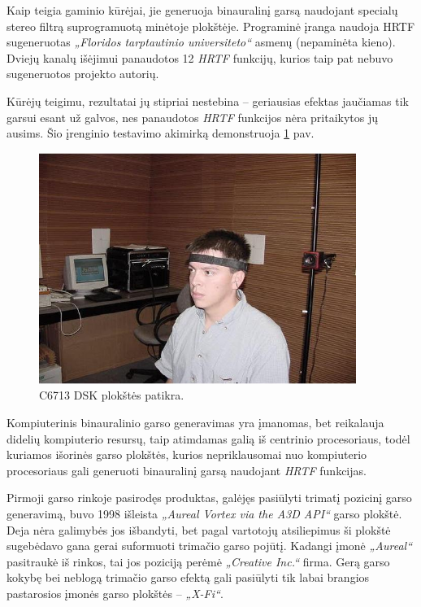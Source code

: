 \documentclass[]{vgtuef}
\begin{document}
Kaip teigia gaminio kūrėjai, jie generuoja binauralinį garsą naudojant specialų stereo filtrą suprogramuotą minėtoje plokštėje. Programinė įranga naudoja HRTF sugeneruotas \textit{„Floridos tarptautinio universiteto“} asmenų (nepaminėta kieno). Dviejų kanalų išėjimui panaudotos 12 \textit{HRTF} funkcijų, kurios taip pat nebuvo sugeneruotos projekto autorių. 

Kūrėjų teigimu, rezultatai jų stipriai nestebina – geriausias efektas jaučiamas tik garsui esant už galvos, nes panaudotos \textit{HRTF} funkcijos nėra pritaikytos jų ausims. Šio įrenginio testavimo akimirką demonstruoja \ref{fig:C6713_dsk_board_checkout} pav.

\begin{figure}[!ht]
  \centering
  \includegraphics[width=390px]{img/c6713_patikra.jpg}
  \caption{C6713 DSK plokštės patikra.}
  \label{fig:C6713_dsk_board_checkout}
\end{figure}


Kompiuterinis binauralinio garso generavimas yra įmanomas, bet reikalauja didelių kompiuterio resursų, taip atimdamas galią iš centrinio procesoriaus, todėl kuriamos išorinės garso plokštės, kurios nepriklausomai nuo kompiuterio procesoriaus gali generuoti binauralinį garsą naudojant \textit{HRTF} funkcijas.

Pirmoji garso rinkoje pasirodęs produktas, galėjęs pasiūlyti trimatį pozicinį garso generavimą, buvo 1998 išleista \textit{„Aureal Vortex via the A3D API“} garso plokštė. Deja nėra  galimybės jos išbandyti, bet pagal vartotojų atsiliepimus ši plokštė sugebėdavo gana gerai suformuoti trimačio garso pojūtį. Kadangi įmonė \textit{„Aureal“} pasitraukė iš rinkos, tai jos poziciją perėmė \textit{„Creative Inc.“} firma. Gerą garso kokybę bei neblogą trimačio garso efektą gali pasiūlyti tik labai brangios pastarosios įmonės garso plokštės – \textit{„X-Fi“}. 
\end{document}
